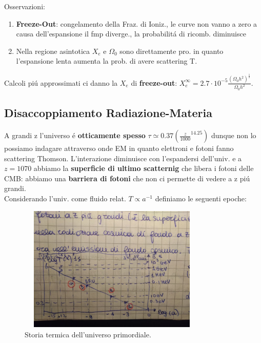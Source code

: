 \documentclass[12pt, a4paper]{article}
\begin{document}
Osservazioni:
\begin{enumerate}
\item \textbf{Freeze-Out}: congelamento della Fraz. di Ioniz., le curve non vanno a zero a causa dell'espansione il fmp diverge., la probabilit\'{a} di ricomb. diminuisce
\item Nella regione asintotica $X_e$ e $\Omega_0$ sono direttamente pro. in quanto l'espansione lenta aumenta la prob. di avere scattering T.
\end{enumerate}
Calcoli pi\'{u} approssimati ci danno la $X_e$ di \textbf{freeze-out}: $X_e^{\infty}=2.7\cdot 10^{-5} \frac{(\Omega_0 h^2)^{\frac{1}{2}}}{\Omega_0 h^2}$.
\subsection{Disaccoppiamento Radiazione-Materia}
A grandi z l'universo \'{e} \textbf{otticamente spesso} $\tau \simeq 0.37(\frac{z}{1000}^{14.25})$ dunque non lo possiamo indagare attraverso onde EM in quanto elettroni e fotoni fanno scattering Thomson. L'interazione diminuisce con l'espandersi dell'univ. e a $z=1070$ abbiamo la \textbf{superficie di ultimo scatternig} che libera i fotoni delle CMB: abbiamo una \textbf{barriera di fotoni} che non ci permette di vedere a z pi\'{u} grandi.\\
Considerando l'univ. come fluido relat. $T\propto a ^{-1}$ definiamo le seguenti epoche:
\begin{figure}[htp]
    \centering
    \includegraphics[width=9cm, height=6cm]{images/storia.jpeg}
    \caption{Storia termica dell'universo primordiale.}
    \label{fig:storia}
\end{figure}
\end{document}
